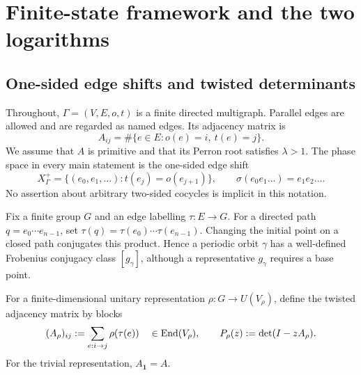 \section{Finite-state framework and the two logarithms}\label{sec:framework}

\subsection{One-sided edge shifts and twisted determinants}

Throughout, \(\Gamma=(V,E,o,t)\) is a finite directed multigraph.  Parallel
edges are allowed and are regarded as named edges.  Its adjacency matrix is
\[
  A_{ij}=\#\{e\in E:o(e)=i,\ t(e)=j\}.
\]
We assume that \(A\) is primitive and that its Perron root satisfies
\(\lambda>1\).  The phase space in every main statement is the one-sided
edge shift
\[
  X_\Gamma^+=\{(e_0,e_1,\ldots):t(e_j)=o(e_{j+1})\},
  \qquad \sigma(e_0e_1\ldots)=e_1e_2\ldots.
\]
No assertion about arbitrary two-sided cocycles is implicit in this
notation.

Fix a finite group \(G\) and an edge labelling \(\tau:E\to G\).  For a
directed path \(q=e_0\cdots e_{n-1}\), set
\(\tau(q)=\tau(e_0)\cdots\tau(e_{n-1})\).  Changing the initial point on a
closed path conjugates this product.  Hence a periodic orbit \(\gamma\) has a
well-defined Frobenius conjugacy class \([g_\gamma]\), although a representative
\(g_\gamma\) requires a base point.

For a finite-dimensional unitary representation
\(\rho:G\to U(V_\rho)\), define the twisted adjacency matrix by blocks
\begin{equation}\label{eq:twisted-adjacency}
  (A_\rho)_{ij}:=\sum_{e:i\to j}\rho(\tau(e))
  \quad\in\operatorname{End}(V_\rho),
  \qquad
  P_\rho(z):=\det(I-zA_\rho).
\end{equation}
For the trivial representation, \(A_{\mathbf1}=A\).

